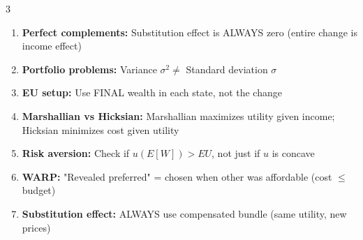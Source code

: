 \documentclass[10pt,landscape]{article}
\begin{document}
\begin{multicols}{3}
\begin{enumerate}[leftmargin=*,noitemsep,topsep=0pt]
\item \textbf{Perfect complements:} Substitution effect is ALWAYS zero (entire change is income effect)

\item \textbf{Portfolio problems:} Variance $\sigma^2 \neq$ Standard deviation $\sigma$

\item \textbf{EU setup:} Use FINAL wealth in each state, not the change

\item \textbf{Marshallian vs Hicksian:} Marshallian maximizes utility given income; Hicksian minimizes cost given utility

\item \textbf{Risk aversion:} Check if $u(E[W]) > EU$, not just if $u$ is concave

\item \textbf{WARP:} "Revealed preferred" = chosen when other was affordable (cost $\leq$ budget)

\item \textbf{Substitution effect:} ALWAYS use compensated bundle (same utility, new prices)
\end{enumerate}

\end{multicols}
\end{document}

